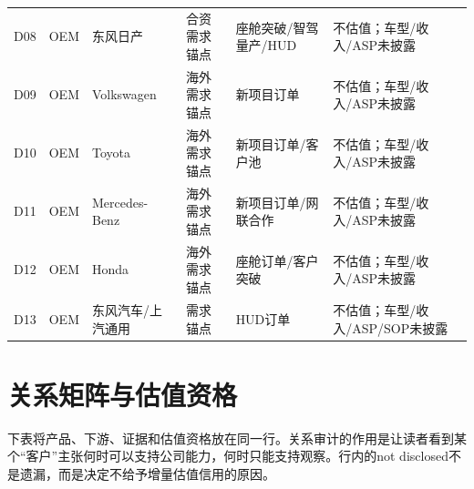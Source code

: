 \begin{longtable}{L{1.0cm}L{1.7cm}L{2.2cm}L{2.3cm}L{2.6cm}L{3.4cm}}
D08 & OEM & 东风日产 & 合资需求锚点 & 座舱突破/智驾量产/HUD & 不估值；车型/收入/ASP未披露 \\
D09 & OEM & Volkswagen & 海外需求锚点 & 新项目订单 & 不估值；车型/收入/ASP未披露 \\
D10 & OEM & Toyota & 海外需求锚点 & 新项目订单/客户池 & 不估值；车型/收入/ASP未披露 \\
D11 & OEM & Mercedes-Benz & 海外需求锚点 & 新项目订单/网联合作 & 不估值；车型/收入/ASP未披露 \\
D12 & OEM & Honda & 海外需求锚点 & 座舱订单/客户突破 & 不估值；车型/收入/ASP未披露 \\
D13 & OEM & 东风汽车/上汽通用 & 需求锚点 & HUD订单 & 不估值；车型/收入/ASP/SOP未披露 \\
\bottomrule
\end{longtable}

\section{关系矩阵与估值资格}

下表将产品、下游、证据和估值资格放在同一行。关系审计的作用是让读者看到某个“客户”主张何时可以支持公司能力，何时只能支持观察。行内的not disclosed不是遗漏，而是决定不给予增量估值信用的原因。

